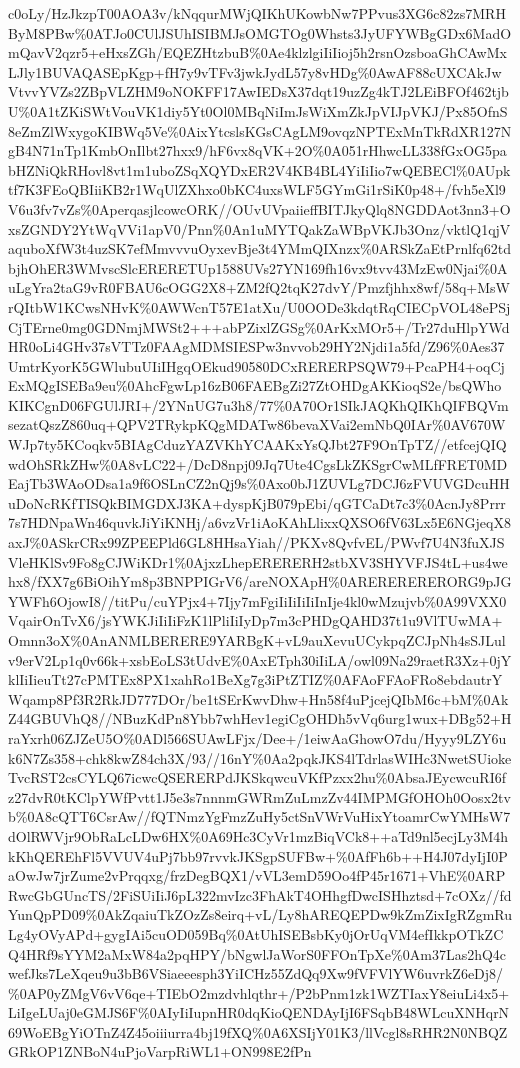 \documentclass[]{article}
\begin{document}
c0oLy/HzJkzpT00AOA3v/kNqqurMWjQIKhUKowbNw7PPvus3XG6c82zs7MRHByM8PBw\%0ATJo0CUlJSUhISIBMJsOMGTOg0Whsts3JyUFYWBgGDx6MadOmQavV2qzr5+eHxsZGh/EQEZHtzbuB\%0Ae4klzlgiIiIioj5h2rsnOzsboaGhCAwMxLJly1BUVAQASEpKgp+fH7y9vTFv3jwkJydL57y8vHDg\%0AwAF88cUXCAkJwVtvvYVZs2ZBpVLZHM9oNOKFF17AwIEDsX37dqt19uzZg4kTJ2LEiBFOf462tjbU\%0A1tZKiSWtVouVK1diy5Yt0Ol0MBqNiImJsWiXmZkJpVIJpVKJ/Px85OfnS8eZmZlWxygoKIBWq5Ve\%0AixYtcslsKGsCAgLM9ovqzNPTExMnTkRdXR127NgB4N71nTp1KmbOnIlbt27hxx9/hF6vx8qVK+2O\%0A051rHhwcLL338fGxOG5pabHZNiQkRHovl8vt1m1uboZSqXQYDxER2V4KB4BL4YiIiIio7wQEBECl\%0AUpktf7K3FEoQBIiiKB2r1WqUlZXhxo0bKC4uxsWLF5GYmGi1rSiK0p48+/fvh5eXl9V6u3fv7vZs\%0AperqasjlcowcORK//OUvUVpaiieffBITJkyQlq8NGDDAot3nn3+OxsZGNDY2YtWqVVi1apV0/Pnn\%0An1uMYTQakZaWBpVKJb3Onz/vktlQ1qjVaquboXfW3t4uzSK7efMmvvvuOyxevBje3t4YMmQIXnzx\%0ARSkZaEtPrnlfq62tdbjhOhER3WMvscSlcERERETUp1588UVs27YN169fh16vx9tvv43MzEw0Njai\%0AuLgYra2taG9vR0FBAU6cOGG2X8+ZM2fQ2tqK27dvY/Pmzfjhhx8wf/58q+MsWrQItbW1KCwsNHvK\%0AWWcnT57E1atXu/U0OODe3kdqtRqCIECpVOL48ePSjCjTErne0mg0GDNmjMWSt2+++abPZixlZGSg\%0ArKxMOr5+/Tr27duHlpYWdHR0oLi4GHv37sVTTz0FAAgMDMSIESPw3nvvob29HY2Njdi1a5fd/Z96\%0Aes37UmtrKyorK5GWlubuUIiIHgqOEkud90580DCxRERERPSQW79+PcaPH4+oqCjExMQgISEBa9eu\%0AhcFgwLp16zB06FAEBgZi27ZtOHDgAKKioqS2e/bsQWhoKIKCgnD06FGUlJRI+/2YNnUG7u3h8/77\%0A70Or1SIkJAQKhQIKhQIFBQVmsezatQszZ860uq+QPV2TRykpKQgMDATw86bevaXVai2emNbQ0IAr\%0AV670WWJp7ty5KCoqkv5BIAgCduzYAZVKhYCAAKxYsQJbt27F9OnTpTZ//etfcejQIQwdOhSRkZHw\%0A8vLC22+/DcD8npj09Jq7Ute4CgsLkZKSgrCwMLfFRET0MDEajTb3WAoODsa1a9f6OSLnCZ2nQj9s\%0Axo0bJ1ZUVLg7DCJ6zFVUVGDcuHHuDoNcRKfTISQkBIMGDXJ3KA+dyspKjB079pEbi/qGTCaDt7c3\%0AcnJy8Prrr7s7HDNpaWn46quvkJiYiKNHj/a6vzVr1iAoKAhLlixxQXSO6fV63Lx5E6NGjeqX8axJ\%0ASkrCRx99ZPEEPld6GL8HHsaYiah//PKXv8QvfvEL/PWvf7U4N3fuXJSVleHKlSv9Fo8gCJWiKDr1\%0AjxzLhepERERERH2stbXV3SHYVFJS4tL+us4wehx8/fXX7g6BiOihYm8p3BNPPIGrV6/areNOXApH\%0ARERERERERORG9pJGYWFh6OjowI8//titPu/cuYPjx4+7Ijy7mFgiIiIiIiIiInIje4kl0wMzujvb\%0A99VXX0VqairOnTvX6/jsYWKJiIiIiFzK1lPliIiIyDp7m3cPHDgQAHD37t1u9VlTUwMA+Omnn3oX\%0AnANMLBERERE9YARBgK+vL9auXevuUCykpqZCJpNh4sSJLulv9erV2Lp1q0v66k+xsbEoLS3tUdvE\%0AxETph30iIiLA/owl09Na29raetR3Xz+0jYklIiIieuTt27cPMTEx8PX1xahRo1BeXg7g3iPtZTIZ\%0AFAoFFAoFRo8ebdautrYWqamp8Pf3R2RkJD777DOr/be1tSErKwvDhw+Hn58f4uPjcejQIbM6c+bM\%0AkZ44GBUVhQ8//NBuzKdPn8Ybb7whHev1egiCgOHDh5vVq6urg1wux+DBg52+HraYxrh06ZJZeU5O\%0ADl566SUAwLFjx/Dee+/1eiwAaGhowO7du/Hyyy9LZY6uk6N7Zs358+chk8kwZ84ch3X/93//16nY\%0Aa2pqkJKS4lTdrlasWIHc3NwetSUiokeTvcRST2csCYLQ67icwcQSERERPdJKSkqwcuVKfPzxx2hu\%0AbsaJEycwcuRI6fz27dvR0tKClpYWfPvtt1J5e3s7nnnmGWRmZuLmzZv44IMPMGfOHOh0Oosx2tvb\%0A8cQTT6CsrAw//fQTNmzYgFmzZuHy5ctSnVWrVuHixYtoamrCwYMHsW7dOlRWVjr9ObRaLcLDw6HX\%0A69Hc3CyVr1mzBiqVCk8++aTd9nl5ecjLy3M4hkKhQEREhFl5VVUV4uPj7bb97rvvkJKSgpSUFBw+\%0AfFh6b++H4J07dyIjI0PaOwJw7jrZume2vPrqqxg/frzDegBQX1/vVL3emD59Oo4fP45r1671+VhE\%0ARPRwcGbGUncTS/2FiSUiIiJ6pL322mvIzc3FhAkT4OHhgfDwcISHhztsd+7cOXz//fdYunQpPD09\%0AkZqaiuTkZOzZs8eirq+vL/Ly8hAREQEPDw9kZmZixIgRZgmRuLg4yOVyAPd+gygIAi5cuOD059Bq\%0AtUhISEBsbKy0jOrUqVM4efIkkpOTkZCQ4HRf9sYYM2aMxW84a2pqHPY/bNgwlJaWorS0FFOnTpXe\%0Am37Las2hQ4cwefJks7LeXqeu9u3bB6VSiaeeesph3YiICHz55ZdQq9Xw9fVFVlYW6uvrkZ6eDj8/\%0AP0yZMgV6vV6qe+TIEbO2mzdvhlqthr+/P2bPnm1zk1WZTIaxY8eiuLi4x5+LiIgeLUaj0eGMJS6F\%0AIyIiIupnHR0dqKioQENDAyIjI6FSqbB48WLcuXNHqrN69WoEBgYiOTnZ4Z45oiiiurra4bj19fXQ\%0A6XSIjY01K3/llVcgl8sRHR2N0NBQZGRkOP1ZNBoN4uPjoVarpRiWL1+ON998E2fPn
\end{document}
